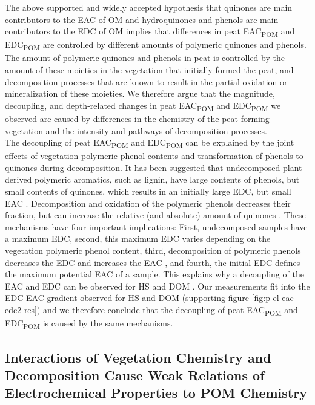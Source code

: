 \documentclass[alpha-refs, lineno]{wiley-article-rmd}
\begin{document}
The above supported and widely accepted hypothesis that quinones are main contributors to the EAC of OM and hydroquinones and phenols are main contributors to the EDC of OM implies that differences in peat EAC\textsubscript{POM} and EDC\textsubscript{POM} are controlled by different amounts of polymeric quinones and phenols. The amount of polymeric quinones and phenols in peat is controlled by the amount of these moieties in the vegetation that initially formed the peat, and decomposition processes that are known to result in the partial oxidation or mineralization of these moieties. We therefore argue that the magnitude, decoupling, and depth-related changes in peat EAC\textsubscript{POM} and EDC\textsubscript{POM} we observed are caused by differences in the chemistry of the peat forming vegetation and the intensity and pathways of decomposition processes.\\
The decoupling of peat EAC\textsubscript{POM} and EDC\textsubscript{POM} can be explained by the joint effects of vegetation polymeric phenol contents and transformation of phenols to quinones during decomposition. It has been suggested that undecomposed plant-derived polymeric aromatics, such as lignin, have large contents of phenols, but small contents of quinones, which results in an initially large EDC, but small EAC \autocite{Aeschbacher.2012}. Decomposition and oxidation of the polymeric phenols decreases their fraction, but can increase the relative (and absolute) amount of quinones \autocite{Aeschbacher.2012,Bolton.2018,LaCroix.2020}. These mechanisms have four important implications: First, undecomposed samples have a maximum EDC, second, this maximum EDC varies depending on the vegetation polymeric phenol content, third, decomposition of polymeric phenols decreases the EDC and increases the EAC \autocite{Aeschbacher.2012}, and fourth, the initial EDC defines the maximum potential EAC of a sample. This explains why a decoupling of the EAC and EDC can be observed for HS and DOM \autocite{Aeschbacher.2012}. Our measurements fit into the EDC-EAC gradient observed for HS and DOM (supporting figure \ref{fig:p-el-eac-edc2-res}) and we therefore conclude that the decoupling of peat EAC\textsubscript{POM} and EDC\textsubscript{POM} is caused by the same mechanisms.

\hypertarget{interactions-of-vegetation-chemistry-and-decomposition-cause-weak-relations-of-electrochemical-properties-to-pom-chemistry}{%
\subsection{Interactions of Vegetation Chemistry and Decomposition Cause Weak Relations of Electrochemical Properties to POM Chemistry}\label{interactions-of-vegetation-chemistry-and-decomposition-cause-weak-relations-of-electrochemical-properties-to-pom-chemistry}}
\end{document}
